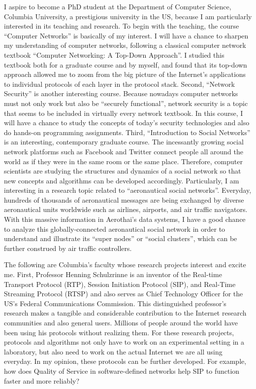 \documentclass[a4paper,10pt]{report}
\newcommand{\university}{Columbia University}
\newcommand{\department}{Department of Computer Science}
\newcommand{\uniabbre}{Columbia}
\begin{document}
\vspace{0.2cm}
I aspire to become a PhD student at the \department, \university, a prestigious university in the US, because I am particularly interested in its teaching and research. To begin with the teaching, the course ``Computer Networks'' is basically of my interest. I will have a chance to sharpen my understanding of computer networks, following a classical computer network textbook ``Computer Networking: A Top-Down Approach''. I studied this textbook both for a graduate course and by myself, and found that its top-down approach allowed me to zoom from the big picture of the Internet's applications to individual protocols of each layer in the protocol stack. Second, ``Network Security'' is another interesting course. Because nowadays computer networks must not only work but also be ``securely functional'', network security is a topic that seems to be included in virtually every network textbook. In this course, I will have a chance to study the concepts of today's security technologies and also do hands-on programming assignments. Third, ``Introduction to Social Networks'' is an interesting, contemporary graduate course. The incessantly growing social network platforms such as Facebook and Twitter connect people all around the world as if they were in the same room or the same place. Therefore, computer scientists are studying the structures and dynamics of a social network so that new concepts and algorithms can be developed accordingly. Particularly, I am interesting in a research topic related to ``aeronautical social networks''. Everyday, hundreds of thousands of aeronautical messages are being exchanged by diverse aeronautical units worldwide such as airlines, airports, and air traffic navigators. With this massive information in Aerothai's data systems, I have a good chance to analyze this globally-connected aeronautical social network in order to understand and illustrate its ``super nodes'' or ``social clusters'', which can be further construed by air traffic controllers. 

\vspace{0.2cm}
The following are \uniabbre's faculty whose research projects interest and excite me. First, Professor Henning Schulzrinne is an inventor of the Real-time Transport Protocol (RTP), Session Initiation Protocol (SIP), and Real-Time Streaming Protocol (RTSP) and also serves as Chief Technology Officer for the US's Federal Communications Commission. This distinguished professor's research makes a tangible and considerable contribution to the Internet research communities and also general users. Millions of people around the world have been using his protocols without realizing them. For these research projects, protocols and algorithms not only have to work on an experimental setting in a laboratory, but also need to work on the actual Internet we are all using everyday. In my opinion, these protocols can be further developed. For example, how does Quality of Service in software-defined networks help SIP to function faster and more reliably? 
\end{document}
